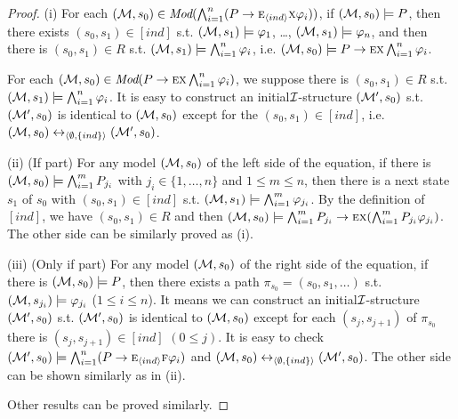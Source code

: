 \documentclass[twoside,11pt]{article}
\begin{document}
	\begin{proof}
		(i)  For each $({\cal M}, s_0) \in \textit{Mod}(\bigwedge_{i=1}^n (P\rightarrow \textsc{e}_{{\langle{ind}\rangle}} \textsc{x} \varphi_i))$, if $({\cal M}, s_0) \models P$, then there exists $(s_0, s_1)\in [ind]$ s.t. $({\cal M}, s_1) \models \varphi_1$, \dots, $({\cal M}, s_1) \models \varphi_n$, and then there is $(s_0, s_1)\in R$ s.t. $({\cal M}, s_1) \models \bigwedge_{i=1}^n \varphi_i$, i.e. $({\cal M}, s_0) \models P\rightarrow \textsc{e} \textsc{x} \bigwedge_{i=1}^n \varphi_i$.
		
		For each $({\cal M}, s_0) \in \textit{Mod}(P\rightarrow \textsc{e} \textsc{x} \bigwedge_{i=1}^n \varphi_i)$, we suppose there is $(s_0, s_1)\in R$ s.t. $({\cal M}, s_1) \models \bigwedge_{i=1}^n \varphi_i$. It is easy to construct an initial${\cal I}$-structure $({\cal M}', s_0)$ s.t. $({\cal M}', s_0)$ is identical to $({\cal M}, s_0)$ except for the $(s_0, s_1) \in [ind]$, i.e. $({\cal M}, s_0) \leftrightarrow_{{\langle{\emptyset, \{ind\}}\rangle}} ({\cal M}', s_0)$.
		
		(ii) (If part) For any model $({\cal M},s_0)$ of the left side of the equation, if there is $({\cal M},s_0) \models \bigwedge_{i=1}^m P_{j_i}$ with $j_i \in \{1, \dots, n\}$ and $1\leq m \leq n$, then there is a next state $s_1$ of $s_0$ with $(s_0, s_1) \in [ind]$ s.t. $({\cal M}, s_1) \models \bigwedge_{i=1}^m \varphi_{j_i}$. By the definition of $[ind]$, we have $(s_0, s_1) \in R$ and then $({\cal M}, s_0) \models \bigwedge_{i=1}^m P_{j_i} \rightarrow \textsc{e} \textsc{x} (\bigwedge_{i=1}^m P_{j_i} \varphi_{j_i})$. The other side can be similarly proved as (i).
		
		(iii) (Only if part) For any model $({\cal M},s_0)$ of the right side of the equation, if there is $({\cal M},s_0) \models P$, then there exists a path $\pi_{s_0} = (s_0, s_1, \dots)$ s.t. $ ({\cal M}, s_{j_i}) \models \varphi_{j_i}$ ($1\leq i \leq n$). It means we can construct an initial${\cal I}$-structure $({\cal M}', s_0)$ s.t. $({\cal M}', s_0)$ is identical to $({\cal M}, s_0)$ except for each $(s_j, s_{j+1})$ of $\pi_{s_0}$ there is $(s_j, s_{j+1}) \in [ind]$ $(0\leq j)$. It is easy to check $({\cal M}', s_0) \models \bigwedge_{i=1}^n (P\rightarrow \textsc{e}_{{\langle{ind}\rangle}} \textsc{f} \varphi_i)$ and  $({\cal M}, s_0) \leftrightarrow_{{\langle{\emptyset, \{ind\}}\rangle}} ({\cal M}', s_0)$.  The other side can be shown similarly as in (ii).
		
		Other results can be proved similarly.
	\end{proof}
	
\end{document}
